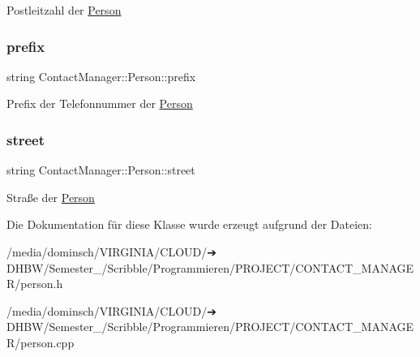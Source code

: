 Postleitzahl der \hyperlink{classContactManager_1_1Person}{Person}

\mbox{\label{classContactManager_1_1Person_afdfe473856f60b61dea2bc1fdabeafd4}} 
\subsubsection{\texorpdfstring{prefix}{prefix}}
{\footnotesize\ttfamily string Contact\+Manager\+::\+Person\+::prefix\hspace{0.3cm}{\ttfamily [protected]}}



Prefix der Telefonnummer der \hyperlink{classContactManager_1_1Person}{Person}

\mbox{\label{classContactManager_1_1Person_aa406cf31ed8b781704ea91aa2efded51}} 
\subsubsection{\texorpdfstring{street}{street}}
{\footnotesize\ttfamily string Contact\+Manager\+::\+Person\+::street\hspace{0.3cm}{\ttfamily [protected]}}



Straße der \hyperlink{classContactManager_1_1Person}{Person}



Die Dokumentation für diese Klasse wurde erzeugt aufgrund der Dateien\+:\begin{DoxyCompactItemize}
\item 
/media/dominsch/\+V\+I\+R\+G\+I\+N\+I\+A/\+C\+L\+O\+U\+D/➔ D\+H\+B\+W/\+Semester\+\_/\+Scribble/\+Programmieren/\+P\+R\+O\+J\+E\+C\+T/\+C\+O\+N\+T\+A\+C\+T\+\_\+\+M\+A\+N\+A\+G\+E\+R/person.\+h\item 
/media/dominsch/\+V\+I\+R\+G\+I\+N\+I\+A/\+C\+L\+O\+U\+D/➔ D\+H\+B\+W/\+Semester\+\_/\+Scribble/\+Programmieren/\+P\+R\+O\+J\+E\+C\+T/\+C\+O\+N\+T\+A\+C\+T\+\_\+\+M\+A\+N\+A\+G\+E\+R/person.\+cpp\end{DoxyCompactItemize}
